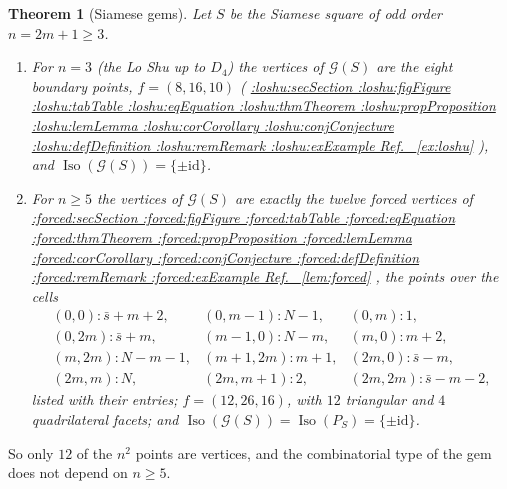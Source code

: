 \documentclass[11pt,a4paper]{article}
\makeatletter
\def\Cref@getprefix#1:#2\relax{#1}
\def\Cref@prefix@sec{sec}
\def\Cref@prefix@fig{fig}
\def\Cref@prefix@tab{tab}
\def\Cref@prefix@eq{eq}
\def\Cref@prefix@thm{thm}
\def\Cref@prefix@prop{prop}
\def\Cref@prefix@lem{lem}
\def\Cref@prefix@cor{cor}
\def\Cref@prefix@conj{conj}
\def\Cref@prefix@def{def}
\def\Cref@prefix@rem{rem}
\def\Cref@prefix@ex{ex}
\def\Cref@type@cap#1{%
  \edef\Cref@tmp{#1}%
  \ifx\Cref@tmp\Cref@prefix@sec Section%
  \else\ifx\Cref@tmp\Cref@prefix@fig Figure%
  \else\ifx\Cref@tmp\Cref@prefix@tab Table%
  \else\ifx\Cref@tmp\Cref@prefix@eq Equation%
  \else\ifx\Cref@tmp\Cref@prefix@thm Theorem%
  \else\ifx\Cref@tmp\Cref@prefix@prop Proposition%
  \else\ifx\Cref@tmp\Cref@prefix@lem Lemma%
  \else\ifx\Cref@tmp\Cref@prefix@cor Corollary%
  \else\ifx\Cref@tmp\Cref@prefix@conj Conjecture%
  \else\ifx\Cref@tmp\Cref@prefix@def Definition%
  \else\ifx\Cref@tmp\Cref@prefix@rem Remark%
  \else\ifx\Cref@tmp\Cref@prefix@ex Example%
  \else Ref.%
  \fi\fi\fi\fi\fi\fi\fi\fi\fi\fi\fi\fi
}
\DeclareRobustCommand{\Cref}[1]{%
  \begingroup
  \edef\Cref@label{#1}%
  \edef\Cref@prefix{\expandafter\Cref@getprefix\Cref@label:\relax}%
  \hyperref[#1]{\Cref@type@cap{\Cref@prefix}~\ref*{#1}}%
  \endgroup
}
\theoremstyle{plain}
\newtheorem{theorem}{Theorem}[section]
\theoremstyle{definition}
\theoremstyle{remark}
\makeatother
\begin{document}
\begin{theorem}[Siamese gems]
\label{thm:siamese}
Let $S$ be the Siamese square of odd order $n=2m+1\ge3$.
\begin{enumerate}
\item[(a)] For $n=3$ (the Lo Shu up to $D_4$) the vertices of $\mathcal G(S)$ are the eight boundary points, $f=(8,16,10)$ (\Cref{ex:loshu}), and $\operatorname{Iso}(\mathcal G(S))=\{\pm\mathrm{id}\}$.
\item[(b)] For $n\ge5$ the vertices of $\mathcal G(S)$ are exactly the twelve forced vertices of \Cref{lem:forced}, the points over the cells
\[
\begin{array}{lll}
(0,0)\colon \bar s+m+2, & (0,m-1)\colon N-1, & (0,m)\colon 1, \\
(0,2m)\colon \bar s+m, & (m-1,0)\colon N-m, & (m,0)\colon m+2, \\
(m,2m)\colon N-m-1, & (m+1,2m)\colon m+1, & (2m,0)\colon \bar s-m, \\
(2m,m)\colon N, & (2m,m+1)\colon 2, & (2m,2m)\colon \bar s-m-2,
\end{array}
\]
listed with their entries; $f=(12,26,16)$, with $12$ triangular and $4$ quadrilateral facets; and $\operatorname{Iso}(\mathcal G(S))=\operatorname{Iso}(P_S)=\{\pm\mathrm{id}\}$.
\end{enumerate}
\end{theorem}

So only $12$ of the $n^2$ points are vertices, and the combinatorial type of the gem does not depend on $n\ge5$.
\end{document}
